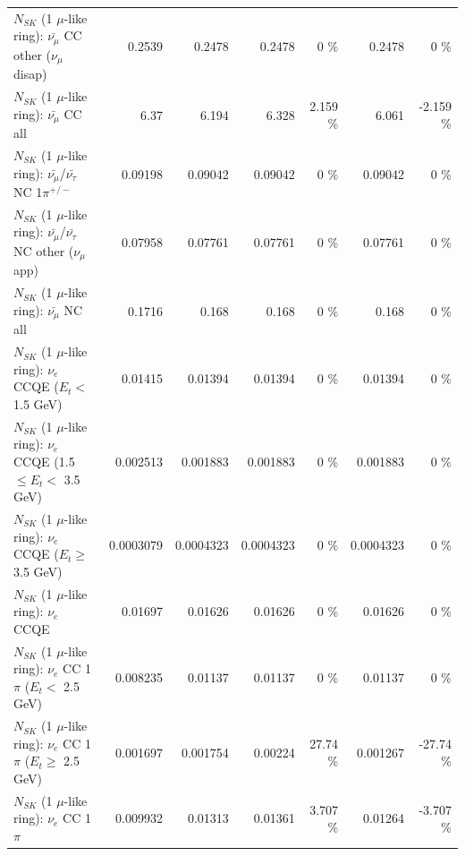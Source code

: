 \begin{table}
\begin{tabular}{| l | r | r | r  r | r  r |}
        $N_{SK}$ (1 $\mu$-like ring): $\bar{\nu_\mu}$ CC other ($\nu_\mu$ disap) &          0.2539 &          0.2478 &          0.2478 &        0 \%  &          0.2478 &        0 \%  \\ 
                          $N_{SK}$ (1 $\mu$-like ring): $\bar{\nu_{\mu}}$ CC all &            6.37 &           6.194 &           6.328 &    2.159 \%  &           6.061 &   -2.159 \%  \\ 
\hline
  $N_{SK}$ (1 $\mu$-like ring): $\bar{\nu_\mu}$/$\bar{\nu_\tau}$ NC 1$\pi^{+/-}$ &         0.09198 &         0.09042 &         0.09042 &        0 \%  &         0.09042 &        0 \%  \\ 
$N_{SK}$ (1 $\mu$-like ring): $\bar{\nu_\mu}$/$\bar{\nu_\tau}$ NC other ($\nu_\mu$ app) &         0.07958 &         0.07761 &         0.07761 &        0 \%  &         0.07761 &        0 \%  \\ 
                          $N_{SK}$ (1 $\mu$-like ring): $\bar{\nu_{\mu}}$ NC all &          0.1716 &           0.168 &           0.168 &        0 \%  &           0.168 &        0 \%  \\ 
\hline
\hline
\hline
                  $N_{SK}$ (1 $\mu$-like ring): $\nu_e$ CCQE ($E_{t} <$ 1.5 GeV) &         0.01415 &         0.01394 &         0.01394 &        0 \%  &         0.01394 &        0 \%  \\ 
         $N_{SK}$ (1 $\mu$-like ring): $\nu_e$ CCQE (1.5 $\leq E_{t} <$ 3.5 GeV) &        0.002513 &        0.001883 &        0.001883 &        0 \%  &        0.001883 &        0 \%  \\ 
               $N_{SK}$ (1 $\mu$-like ring): $\nu_e$ CCQE ($E_{t} \geq$ 3.5 GeV) &       0.0003079 &       0.0004323 &       0.0004323 &        0 \%  &       0.0004323 &        0 \%  \\ 
\hline
                                      $N_{SK}$ (1 $\mu$-like ring): $\nu_e$ CCQE &         0.01697 &         0.01626 &         0.01626 &        0 \%  &         0.01626 &        0 \%  \\ 
\hline
             $N_{SK}$ (1 $\mu$-like ring): $\nu_e$ CC 1$\pi$ ($E_{t} <$ 2.5 GeV) &        0.008235 &         0.01137 &         0.01137 &        0 \%  &         0.01137 &        0 \%  \\ 
          $N_{SK}$ (1 $\mu$-like ring): $\nu_e$ CC 1$\pi$ ($E_{t} \geq$ 2.5 GeV) &        0.001697 &        0.001754 &         0.00224 &    27.74 \%  &        0.001267 &   -27.74 \%  \\ 
\hline
                                 $N_{SK}$ (1 $\mu$-like ring): $\nu_e$ CC 1$\pi$ &        0.009932 &         0.01313 &         0.01361 &    3.707 \%  &         0.01264 &   -3.707 \%  \\ 

\end{tabular}
\end{table}
